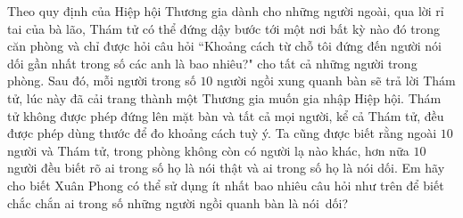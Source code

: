 \begin{multicols}{2}
\begin{figure}[H]
		\vspace*{-15pt}
	\end{figure}
	Theo quy định của Hiệp hội Thương gia dành cho những người ngoài, qua lời rỉ tai của bà lão, Thám tử có thể đứng dậy bước tới một nơi bất kỳ nào đó trong căn phòng và chỉ được hỏi câu hỏi ``Khoảng cách từ chỗ tôi đứng đến người nói dối gần nhất trong số các anh là bao nhiêu?" cho tất cả những người trong phòng. Sau đó, mỗi người trong số $10$ người ngồi xung quanh bàn sẽ trả lời Thám tử, lúc này đã cải trang thành một Thương gia muốn gia nhập Hiệp hội. Thám tử không được phép đứng lên mặt bàn và tất cả mọi người, kể cả Thám tử, đều được phép dùng thước để đo khoảng cách tuỳ ý. Ta cũng được biết rằng ngoài $10$ người và Thám tử, trong phòng không còn có người lạ nào khác, hơn nữa $10$ người đều biết rõ ai trong số họ là nói thật và ai trong số họ là nói dối. Em hãy cho biết Xuân Phong có thể sử dụng ít nhất bao nhiêu câu hỏi như trên để biết chắc chắn ai trong số những người ngồi quanh bàn là nói~dối?
\end{multicols}
\newpage
\begingroup
{} 
\centering
\endgroup
\vspace*{35pt}

